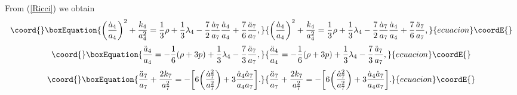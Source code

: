 \documentclass[a4paper,12pt]{article}
\begin{document}
From (\ref{Ricci}) we obtain
\begin{equation}\coord{}\boxEquation{
\label{modfriedmann}
\biggl(\frac{{\dot a}_4}{a_4}\biggr)^2+\frac{k_4}{a_4^2}
=\frac{1}{3}\rho+\frac{1}{3}\lambda_4-\frac{7}{2}\frac{{\dot
a}_7}{a_7}\frac{{\dot a}_4}{a_4} +\frac{7}{6}\frac{{\ddot
a}_7}{a_7}, }{
\biggl(\frac{{\dot a}_4}{a_4}\biggr)^2+\frac{k_4}{a_4^2}
=\frac{1}{3}\rho+\frac{1}{3}\lambda_4-\frac{7}{2}\frac{{\dot
a}_7}{a_7}\frac{{\dot a}_4}{a_4} +\frac{7}{6}\frac{{\ddot
a}_7}{a_7}, }{ecuacion}\coordE{}\end{equation}
\begin{equation}\coord{}\boxEquation{
\label{acceleration}
\frac{{\ddot a}_4}{a_4}
=-\frac{1}{6}(\rho+3p)+\frac{1}{3}\lambda_4-\frac{7}{3}\frac{{\ddot
a_7}}{a_7}, }{
\frac{{\ddot a}_4}{a_4}
=-\frac{1}{6}(\rho+3p)+\frac{1}{3}\lambda_4-\frac{7}{3}\frac{{\ddot
a_7}}{a_7}, }{ecuacion}\coordE{}\end{equation}
\begin{equation}\coord{}\boxEquation{
\frac{{\ddot a}_7}
{a_7}+\frac{2k_7}{a_7^2}
=-\biggl[6\biggl(\frac{{\dot a}_7^2}{a_7^2}\biggr)
+3\frac{{\dot a}_4{\dot
a}_7}{a_4a_7}\biggr].
}{
\frac{{\ddot a}_7}
{a_7}+\frac{2k_7}{a_7^2}
=-\biggl[6\biggl(\frac{{\dot a}_7^2}{a_7^2}\biggr)
+3\frac{{\dot a}_4{\dot
a}_7}{a_4a_7}\biggr].
}{ecuacion}\coordE{}\end{equation}
\end{document}

